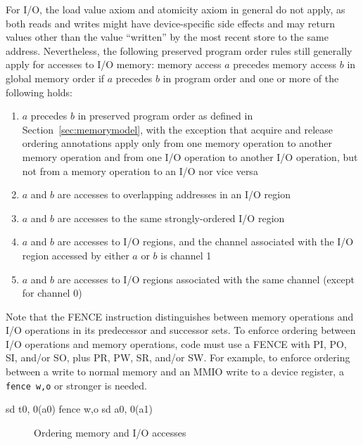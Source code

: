 For I/O, the load value axiom and atomicity axiom in general do not apply, as both reads and writes might have device-specific side effects and may return values other than the value ``written'' by the most recent store to the same address.
Nevertheless, the following preserved program order rules still generally apply for accesses to I/O memory:
memory access $a$ precedes memory access $b$ in global memory order if $a$ precedes $b$ in program order and one or more of the following holds:
\begin{enumerate}
  \item $a$ precedes $b$ in preserved program order as defined in Section~\ref{sec:memorymodel}, with the exception that acquire and release ordering annotations apply only from one memory operation to another memory operation and from one I/O operation to another I/O operation, but not from a memory operation to an I/O nor vice versa
  \item $a$ and $b$ are accesses to overlapping addresses in an I/O region
  \item $a$ and $b$ are accesses to the same strongly-ordered I/O region
  \item $a$ and $b$ are accesses to I/O regions, and the channel associated with the I/O region accessed by either $a$ or $b$ is channel 1
  \item $a$ and $b$ are accesses to I/O regions associated with the same channel (except for channel 0)
\end{enumerate}

Note that the FENCE instruction distinguishes between memory operations and I/O operations in its predecessor and successor sets.
To enforce ordering between I/O operations and memory operations, code must use a FENCE with PI, PO, SI, and/or SO, plus PR, PW, SR, and/or SW.
For example, to enforce ordering between a write to normal memory and an MMIO write to a device register, a {\tt fence w,o} or stronger is needed.

\begin{verbbox}
  sd t0, 0(a0)
  fence w,o
  sd a0, 0(a1)
\end{verbbox}
\begin{figure}[h!]
  \centering\small
  \theverbbox
  \caption{Ordering memory and I/O accesses}
  \label{fig:litmus:wo}
\end{figure}

